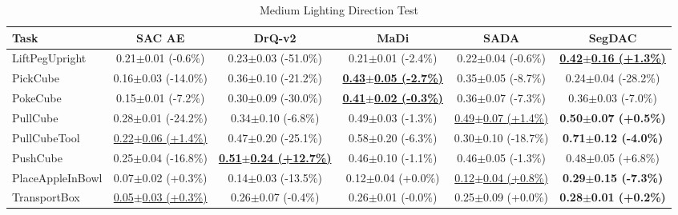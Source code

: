 \begin{table}[htbp]
\centering
\scriptsize
\caption{Medium Lighting Direction Test}
\label{tab:appendix_lightingdirectiontest_medium}
\begin{adjustbox}{max width=\textwidth}
\begin{tabular}{l*{5}{c}}
\toprule
\textbf{Task} & \textbf{SAC AE} & \textbf{DrQ-v2} & \textbf{MaDi} & \textbf{SADA} & \textbf{SegDAC} \\
\midrule
LiftPegUpright & 0.21$\pm$0.01 \scriptsize{(-0.6\%)} & 0.23$\pm$0.03 \scriptsize{(-51.0\%)} & 0.21$\pm$0.01 \scriptsize{(-2.4\%)} & 0.22$\pm$0.04 \scriptsize{(-0.6\%)} & \textbf{\underline{0.42$\pm$0.16 \scriptsize{(+1.3\%)}}} \\
PickCube & 0.16$\pm$0.03 \scriptsize{(-14.0\%)} & 0.36$\pm$0.10 \scriptsize{(-21.2\%)} & \textbf{\underline{0.43$\pm$0.05 \scriptsize{(-2.7\%)}}} & 0.35$\pm$0.05 \scriptsize{(-8.7\%)} & 0.24$\pm$0.04 \scriptsize{(-28.2\%)} \\
PokeCube & 0.15$\pm$0.01 \scriptsize{(-7.2\%)} & 0.30$\pm$0.09 \scriptsize{(-30.0\%)} & \textbf{\underline{0.41$\pm$0.02 \scriptsize{(-0.3\%)}}} & 0.36$\pm$0.07 \scriptsize{(-7.3\%)} & 0.36$\pm$0.03 \scriptsize{(-7.0\%)} \\
PullCube & 0.28$\pm$0.01 \scriptsize{(-24.2\%)} & 0.34$\pm$0.10 \scriptsize{(-6.8\%)} & 0.49$\pm$0.03 \scriptsize{(-1.3\%)} & \underline{0.49$\pm$0.07 \scriptsize{(+1.4\%)}} & \textbf{0.50$\pm$0.07 \scriptsize{(+0.5\%)}} \\
PullCubeTool & \underline{0.22$\pm$0.06 \scriptsize{(+1.4\%)}} & 0.47$\pm$0.20 \scriptsize{(-25.1\%)} & 0.58$\pm$0.20 \scriptsize{(-6.3\%)} & 0.30$\pm$0.10 \scriptsize{(-18.7\%)} & \textbf{0.71$\pm$0.12 \scriptsize{(-4.0\%)}} \\
PushCube & 0.25$\pm$0.04 \scriptsize{(-16.8\%)} & \textbf{\underline{0.51$\pm$0.24 \scriptsize{(+12.7\%)}}} & 0.46$\pm$0.10 \scriptsize{(-1.1\%)} & 0.46$\pm$0.05 \scriptsize{(-1.3\%)} & 0.48$\pm$0.05 \scriptsize{(+6.8\%)} \\
PlaceAppleInBowl & 0.07$\pm$0.02 \scriptsize{(+0.3\%)} & 0.14$\pm$0.03 \scriptsize{(-13.5\%)} & 0.12$\pm$0.04 \scriptsize{(+0.0\%)} & \underline{0.12$\pm$0.04 \scriptsize{(+0.8\%)}} & \textbf{0.29$\pm$0.15 \scriptsize{(-7.3\%)}} \\
TransportBox & \underline{0.05$\pm$0.03 \scriptsize{(+0.3\%)}} & 0.26$\pm$0.07 \scriptsize{(-0.4\%)} & 0.26$\pm$0.01 \scriptsize{(-0.0\%)} & 0.25$\pm$0.09 \scriptsize{(+0.0\%)} & \textbf{0.28$\pm$0.01 \scriptsize{(+0.2\%)}} \\
\bottomrule
\end{tabular}
\end{adjustbox}
\end{table}

